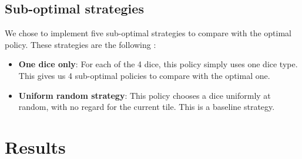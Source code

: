 \documentclass[12pt, twocolumn]{article}
\begin{document}
\subsection*{Sub-optimal strategies}
\noindent We chose to implement five sub-optimal strategies to compare with the optimal policy. These strategies are the following :
\begin{itemize}

    \item \textbf{One dice only}: For each of the 4 dice, this policy simply uses one dice type. This gives us 4 sub-optimal policies to compare with the optimal one.
    \item \textbf{Uniform random strategy}: This policy chooses a dice uniformly at random, with no regard for the current tile. This is a baseline strategy.

\end{itemize}


\section*{Results}

\end{document}
